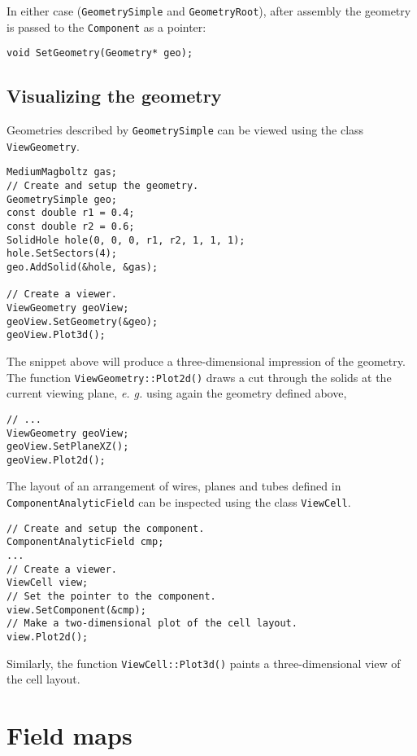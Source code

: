 In either case (\texttt{GeometrySimple} and \texttt{GeometryRoot}),
after assembly the geometry is passed to the \texttt{Component} as a pointer:
\begin{lstlisting}
void SetGeometry(Geometry* geo);
\end{lstlisting}

\subsection{Visualizing the geometry}

Geometries described by \texttt{GeometrySimple} can be viewed 
using the class \texttt{ViewGeometry}. 
\begin{lstlisting}
MediumMagboltz gas;
// Create and setup the geometry.
GeometrySimple geo;
const double r1 = 0.4;
const double r2 = 0.6;
SolidHole hole(0, 0, 0, r1, r2, 1, 1, 1);
hole.SetSectors(4);
geo.AddSolid(&hole, &gas);

// Create a viewer.
ViewGeometry geoView;
geoView.SetGeometry(&geo);
geoView.Plot3d();
\end{lstlisting}
The snippet above will produce a three-dimensional impression of the geometry.
The function \texttt{ViewGeometry::Plot2d()} draws a cut through the solids 
at the current viewing plane, \textit{e. g.} using again the geometry defined above,
\begin{lstlisting}
// ...
ViewGeometry geoView;
geoView.SetPlaneXZ();
geoView.Plot2d();
\end{lstlisting} 


The layout of an arrangement of wires, planes and tubes
defined in \texttt{ComponentAnalyticField} 
can be inspected using the class \texttt{ViewCell}.
\begin{lstlisting}
// Create and setup the component.
ComponentAnalyticField cmp;
... 
// Create a viewer.
ViewCell view;
// Set the pointer to the component.
view.SetComponent(&cmp);
// Make a two-dimensional plot of the cell layout.
view.Plot2d();
\end{lstlisting}
Similarly, the function \texttt{ViewCell::Plot3d()} paints
a three-dimensional view of the cell layout.

\section{Field maps}

